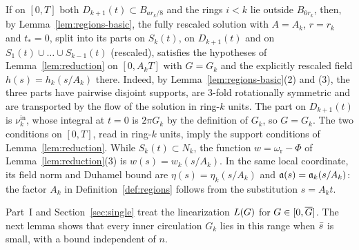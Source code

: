 If on $[0,T]$ both $D_{k+1}(t)\subset B_{ar_k/8}$ and the rings $i<k$ lie outside
$B_{6r_k}$, then, by Lemma~\ref{lem:regions-basic}, the fully rescaled solution
with $A=A_k$, $r=r_k$ and $t_*=0$, split into its parts on $S_k(t)$, on $D_{k+1}(t)$ and on
$S_1(t)\cup\dots\cup S_{k-1}(t)$ (rescaled), satisfies the hypotheses of
Lemma~\ref{lem:reduction} on $[0,A_kT]$ with $G=G_k$ and the explicitly
rescaled field $h(s)=h_k(s/A_k)$ there. Indeed, by Lemma~\ref{lem:regions-basic}\textup{(2)} and \textup{(3)}, the
three parts have pairwise disjoint supports, are $3$-fold rotationally symmetric
and are transported by the flow of the solution in ring-$k$ units. The part on
$D_{k+1}(t)$ is $\nu^{\mathrm{in}}_k$, whose integral at $t=0$ is $2\pi G_k$ by
the definition of $G_k$, so $G=G_k$. The two conditions on $[0,T]$, read in ring-$k$
units, imply the support conditions of Lemma~\ref{lem:reduction}. While
$S_k(t)\subset N_k$, the function $w=\omega_{\mathrm r}-\Phi$ of
Lemma~\ref{lem:reduction}\textup{(3)} is $w(s)=w_k(s/A_k)$. In the same
local coordinate, its field norm and Duhamel bound are
$\eta(s)=\eta_k(s/A_k)$ and $\mathfrak{a}(s)=\mathfrak{a}_k(s/A_k)$: the factor $A_k$ in
Definition~\ref{def:regions} follows from the substitution $s=A_kt$.

Part~I and Section~\ref{sec:single} treat the linearization $L(G)$ for
$G\in[0,\overline{G}]$. The next lemma shows that every inner circulation $G_k$ lies in
this range when $\bar s$ is small, with a bound independent of $n$.

